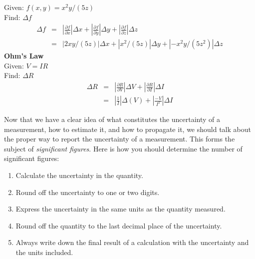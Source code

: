 Given: $f(x,y) = x^2y/(5z)$ \\
Find:  $\Delta f$ \\
\begin{eqnarray*}
\Delta  f & = & \left| \frac{\partial f}{\partial x} \right| \Delta x +
           \left| \frac{\partial f}{\partial y} \right| \Delta y +
            \left| \frac{\partial f}{\partial z} \right| \Delta z \\
& = & \left|2 x y/ (5z)\right| \Delta x +  \left| x^2/(5z) \right| \Delta y +
\left|-x^2y/(5z^2)\right| \Delta z 
\end{eqnarray*}
  {\bf Ohm's Law}\\
Given: $V = IR $ \\
Find:  $\Delta R$ \\
 \begin{eqnarray*}
\Delta R  & = & \left| \frac{\partial R}{\partial V} \right| \Delta V +
           \left| \frac{\partial R}{\partial I} \right| \Delta I \\
  & = & \left| \frac{1}{I} \right| \Delta(V) + \left| \frac{-V}{I^2} \right| \Delta I
\end{eqnarray*}

Now that we have a clear idea of  what constitutes  the uncertainty of a 
measurement, how to estimate it, and how to propagate it, we should talk about
the proper way to report the uncertainty of a measurement. This forms the 
subject of {\it significant figures}. Here is how you should determine the 
number of significant figures:
\begin{enumerate}
\item Calculate the uncertainty in the quantity.
\item Round off the uncertainty to one or two digits.
\item Express the uncertainty in the same units as the quantity measured.
\item Round off the quantity to the last decimal place of the uncertainty.
\item Always write down the final result of a calculation with the uncertainty
and the units included.
\end{enumerate}

